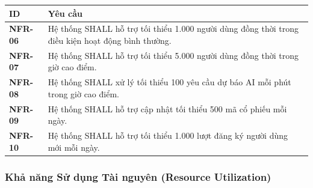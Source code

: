 \documentclass[12pt, a4paper]{article}
\begin{document}
\begin{table}[H]
    \centering
    \renewcommand{\arraystretch}{1.3}

    \begin{tabularx}{\textwidth}{|l|X|}
        \hline
        \rowcolor{gray!10}
        \textbf{ID}     & \textbf{Yêu cầu}                                                                                  \\
        \hline
        \textbf{NFR-06} & Hệ thống SHALL hỗ trợ tối thiểu 1.000 người dùng đồng thời trong điều kiện hoạt động bình thường. \\
        \hline
        \textbf{NFR-07} & Hệ thống SHALL hỗ trợ tối thiểu 5.000 người dùng đồng thời trong giờ cao điểm.                    \\
        \hline
        \textbf{NFR-08} & Hệ thống SHALL xử lý tối thiểu 100 yêu cầu dự báo AI mỗi phút trong giờ cao điểm.                 \\
        \hline
        \textbf{NFR-09} & Hệ thống SHALL hỗ trợ cập nhật tối thiểu 500 mã cổ phiếu mỗi ngày.                                \\
        \hline
        \textbf{NFR-10} & Hệ thống SHALL hỗ trợ tối thiểu 1.000 lượt đăng ký người dùng mới mỗi ngày.                       \\
        \hline
    \end{tabularx}

\end{table}

\subsubsection{Khả năng Sử dụng Tài nguyên (Resource Utilization)}
\end{document}
